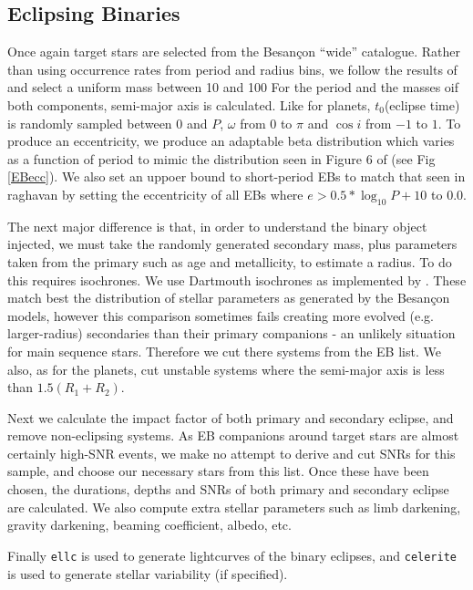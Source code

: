 \documentclass{article}
\begin{document}
\subsection{Eclipsing Binaries}
Once again target stars are selected from the Besan\c{c}on “wide” catalogue. Rather than using occurrence rates from period and radius bins, we follow the results of \citet{raghavan2010survey} and select a uniform mass between 10 and 100%
For the period and the masses oif both components, semi-major axis is calculated. Like for planets, $t_0$(eclipse time) is randomly sampled between 0 and $P$, $\omega$ from $0$ to $\pi$ and $\cos{i}$ from $-1$ to $1$.
To produce an eccentricity, we produce an adaptable beta distribution which varies as a function of period to mimic the distribution seen in Figure 6 of \citet{raghavan2010survey} (see Fig \ref{EBecc}). 
We also set an uppoer bound to short-period EBs to match that seen in raghavan by setting the eccentricity of all EBs where $e>0.5*\log_10{P+10}$ to $0.0$.

The next major difference is that, in order to understand the binary object injected, we must take the randomly generated secondary mass, plus parameters taken from the primary such as age and metallicity, to estimate a radius.
To do this requires isochrones. We use Dartmouth isochrones as implemented by \citet{morton2015isochrones}. 
These match best the distribution of stellar parameters as generated by the Besan\c{c}on models, however this comparison sometimes fails creating more evolved (e.g. larger-radius) secondaries than their primary companions - an unlikely situation for main sequence stars.
Therefore we cut there systems from the EB list.
We also, as for the planets, cut unstable systems where the semi-major axis is less than $1.5(R_1+R_2)$.

Next we calculate the impact factor of both primary and secondary eclipse, and remove non-eclipsing systems.
As EB companions around target stars are almost certainly high-SNR events, we make no attempt to derive and cut SNRs for this sample, and choose our necessary stars from this list.
Once these have been chosen, the durations, depths and SNRs of both primary and secondary eclipse are calculated.
We also compute extra stellar parameters such as limb darkening, gravity darkening, beaming coefficient, albedo, etc.

Finally \texttt{ellc} is used to generate lightcurves of the binary eclipses, and \texttt{celerite} is used to generate stellar variability (if specified). 
\end{document}
